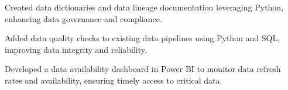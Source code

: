 
\begin{bullets}
	\item Created data dictionaries and data lineage documentation leveraging Python, enhancing data governance and compliance.
	\item Added data quality checks to existing data pipelines using Python and SQL, improving data integrity and reliability.
	\item Developed a data availability dashboard in Power BI to monitor data refresh rates and availability, ensuring timely access to critical data.
\end{bullets}